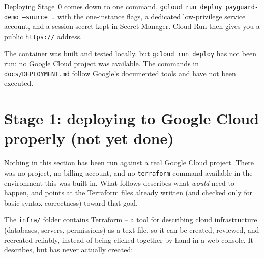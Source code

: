 \documentclass[11pt]{report}
\newcommand{\file}[1]{\texttt{#1}}
\newcommand{\code}[1]{\texttt{#1}}
\begin{document}
Deploying Stage~0 comes down to one command, \code{gcloud run deploy
payguard-demo --source .} with the one-instance flags, a dedicated
low-privilege service account, and a session secret kept in Secret
Manager. Cloud Run then gives you a public \code{https://} address.

\begin{honesty}
The container was built and tested locally, but \code{gcloud run deploy}
has not been run: no Google Cloud project was available. The commands in
\file{docs/DEPLOYMENT.md} follow Google's documented tools and have not
been executed.
\end{honesty}

\section{Stage 1: deploying to Google Cloud properly (not yet done)}

\begin{honesty}
Nothing in this section has been run against a real Google Cloud project.
There was no project, no billing account, and no \code{terraform} command
available in the environment this was built in. What follows describes
what \emph{would} need to happen, and points at the Terraform files
already written (and checked only for basic syntax correctness) toward
that goal.
\end{honesty}

The \file{infra/} folder contains Terraform -- a tool for describing cloud
infrastructure (databases, servers, permissions) as a text file, so it can
be created, reviewed, and recreated reliably, instead of being clicked
together by hand in a web console. It describes, but has never actually
created:
\end{document}
